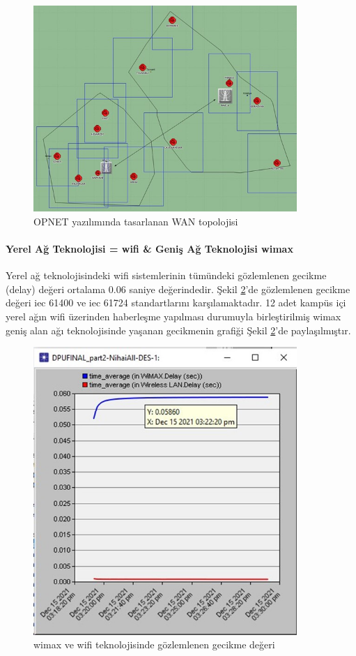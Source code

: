 \begin{figure}[htbp]
\centerline{\includegraphics[width=10cm]{Resim/sekil4-29.jpg}}
\caption{OPNET yazılımında tasarlanan WAN topolojisi}
\label{fig:4-30}
\end{figure}



\paragraph{Yerel Ağ Teknolojisi = \gls{wifi} \& Geniş Ağ Teknolojisi \gls{wimax}}

Yerel ağ teknolojisindeki \gls{wifi} sistemlerinin tümündeki gözlemlenen gecikme (delay) değeri ortalama 0.06 saniye değerindedir. Şekil \ref{fig:4-31}’de gözlemlenen gecikme değeri \gls{iec} 61400 ve \gls{iec} 61724 standartlarını karşılamaktadır. 12 adet kampüs içi yerel ağın \gls{wifi} üzerinden haberleşme yapılması durumuyla birleştirilmiş \gls{wimax} geniş alan ağı teknolojisinde yaşanan gecikmenin grafiği Şekil \ref{fig:4-31}’de paylaşılmıştır.



\begin{figure}[htbp]
\centerline{\includegraphics[width=10cm]{Resim/Sekil4-30.jpg}}
\caption{\gls{wimax} ve \gls{wifi} teknolojisinde gözlemlenen gecikme değeri}
\label{fig:4-31}
\end{figure}

